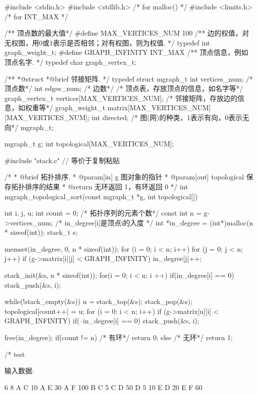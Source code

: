 \begin{Codex}[label=mgraph_topological_sort.c]
#include <stdio.h>
#include <stdlib.h>  /* for malloc() */
#include <limits.h>  /* for INT_MAX */

/** 顶点数的最大值*/
#define MAX_VERTICES_NUM 100
/** 边的权值，对无权图，用0或1表示是否相邻；对有权图，则为权值. */
typedef int graph_weight_t;
#define GRAPH_INFINITY INT_MAX
/** 顶点信息，例如顶点名字. */
typedef char graph_vertex_t;

/**
 *@struct
 *@brief 邻接矩阵.
 */
typedef struct mgraph_t {
    int vertices_num; /* 顶点数*/
    int edges_num; /* 边数*/
    /* 顶点表，存放顶点的信息，如名字等*/
    graph_vertex_t vertices[MAX_VERTICES_NUM];
    /* 邻接矩阵，存放边的信息，如权重等*/
    graph_weight_t matrix[MAX_VERTICES_NUM][MAX_VERTICES_NUM];
    int directed; /* 图(网)的种类，1表示有向，0表示无向*/
} mgraph_t;

mgraph_t g;
int topological[MAX_VERTICES_NUM];


#include "stack.c"    // 等价于复制粘贴


/*
  * @brief 拓扑排序.
  * @param[in] g 图对象的指针
  * @param[out] topological 保存拓扑排序的结果
  * @return 无环返回 1，有环返回 0
  */
int mgraph_topological_sort(const mgraph_t *g, int topological[]) {
    int i, j, u;
    int count = 0; /* 拓扑序列的元素个数*/
    const int n = g->vertices_num;
    /* in_degree[i]是顶点i的入度 */
    int *in_degree = (int*)malloc(n * sizeof(int));
    stack_t s;

    memset(in_degree, 0, n * sizeof(int));
    for (i = 0; i < n; i++) {
        for (j = 0; j < n; j++) {
            if (g->matrix[i][j] < GRAPH_INFINITY)
                in_degree[j]++;
        }
    }

    stack_init(&s, n * sizeof(int));
    for(i = 0; i < n; i ++) {
        if(in_degree[i] == 0)
            stack_push(&s, i);
    }

    while(!stack_empty(&s)) {
        u = stack_top(&s); stack_pop(&s);
        topological[count++] = u;
        for (i = 0; i < n; i++) if (g->matrix[u][i] < GRAPH_INFINITY) {
                if(--in_degree[i] == 0)
                    stack_push(&s, i);
        }
    }

    free(in_degree);
    if(count != n) { /* 有环*/
        return 0;
    } else { /* 无环*/
        return 1;
    }
}


/* test

输入数据:

6 8
A C 10
A E 30
A F 100
B C 5
C D 50
D 5 10
E D 20
E F 60


\end{Codex}

